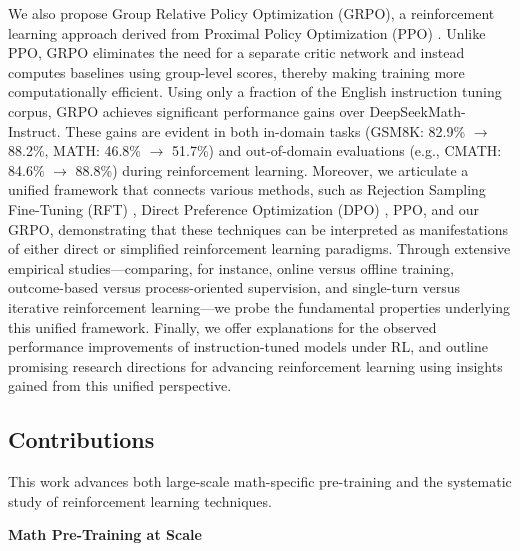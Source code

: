 We also propose Group Relative Policy Optimization (GRPO), a reinforcement learning approach derived from Proximal Policy Optimization (PPO) \citep{schulman2017proximal}. Unlike PPO, GRPO eliminates the need for a separate critic network and instead computes baselines using group-level scores, thereby making training more computationally efficient. Using only a fraction of the English instruction tuning corpus, GRPO achieves significant performance gains over DeepSeekMath-Instruct. These gains are evident in both in-domain tasks (GSM8K: 82.9\% $\rightarrow$ 88.2\%, MATH: 46.8\% $\rightarrow$ 51.7\%) and out-of-domain evaluations (e.g., CMATH: 84.6\% $\rightarrow$ 88.8\%) during reinforcement learning. Moreover, we articulate a unified framework that connects various methods, such as Rejection Sampling Fine-Tuning (RFT) \citep{yuan2023scaling}, Direct Preference Optimization (DPO) \citep{dpo}, PPO, and our GRPO, demonstrating that these techniques can be interpreted as manifestations of either direct or simplified reinforcement learning paradigms. Through extensive empirical studies—comparing, for instance, online versus offline training, outcome-based versus process-oriented supervision, and single-turn versus iterative reinforcement learning—we probe the fundamental properties underlying this unified framework. Finally, we offer explanations for the observed performance improvements of instruction-tuned models under RL, and outline promising research directions for advancing reinforcement learning using insights gained from this unified perspective.

\subsection{Contributions}

This work advances both large-scale math-specific pre-training and the systematic study of reinforcement learning techniques.

\textbf{Math Pre-Training at Scale}

